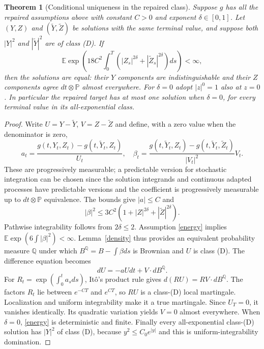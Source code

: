 \documentclass[11pt]{article}
\newtheorem{theorem}{Theorem}
\newcommand{\E}{\mathbb E}
\newcommand{\Prb}{\mathbb P}
\newcommand{\Q}{\mathbb Q}
\begin{document}
\begin{theorem}[Conditional uniqueness in the repaired class]\label{main}
Suppose $g$ has all the repaired assumptions above with constant $C>0$
and exponent $\delta\in[0,1]$. Let $(Y,Z)$ and $(\widetilde Y,\widetilde Z)$
be solutions with the same terminal value, and suppose both $|Y|^2$ and
$|\widetilde Y|^2$ are of class (D). If
\begin{equation}\label{energy}
 \E\exp\left(18C^2\int_0^T
                  (|Z_s|^{2\delta}+|\widetilde Z_s|^{2\delta})ds\right)
 <\infty,
\end{equation}
then the solutions are equal: their $Y$ components are indistinguishable
and their $Z$ components agree $dt\otimes\Prb$ almost everywhere.
For $\delta=0$ adopt $|z|^0=1$ also at $z=0$.
In particular the repaired target has at most one solution when
$\delta=0$, for every terminal value in its all-exponential class.
\end{theorem}
\begin{proof}
Write $U=Y-\widetilde Y$, $V=Z-\widetilde Z$ and define, with a zero
value when the denominator is zero,
\[
 a_t=\frac{g(t,Y_t,Z_t)-g(t,\widetilde Y_t,Z_t)}{U_t},\quad
 \beta_t=\frac{g(t,\widetilde Y_t,Z_t)-g(t,\widetilde Y_t,\widetilde Z_t)}
                    {|V_t|^2}V_t.
\]
These are progressively measurable; a predictable version for stochastic
integration can be chosen since the solution integrands and continuous
adapted processes have predictable versions and the coefficient is
progressively measurable up to $dt\otimes\Prb$ equivalence.
The bounds give $|a|\leq C$ and
\[
 |\beta|^2\leq3C^2(1+|Z|^{2\delta}+|\widetilde Z|^{2\delta}).
\]
Pathwise integrability follows from $2\delta\leq2$. Assumption
\eqref{energy} implies $\E\exp(6\int|\beta|^2)<\infty$.
Lemma~\ref{density} thus provides an equivalent probability measure
$\Q$ under which $B^\Q=B-\int\beta ds$ is Brownian and $U$ is
class (D). The difference equation becomes
\[
 dU=-aUdt+V\cdot dB^\Q.
\]
For $R_t=\exp(\int_0^t a_sds)$, It\^o's product rule gives
$d(RU)=RV\cdot dB^\Q$. The factors $R_t$ lie between $e^{-CT}$ and
$e^{CT}$, so $RU$ is a class-(D) local martingale. Localization and
uniform integrability make it a true martingale. Since $U_T=0$, it
vanishes identically. Its quadratic variation yields $V=0$ almost
everywhere. When $\delta=0$, \eqref{energy} is deterministic and finite.
Finally every all-exponential class-(D) solution has $|Y|^2$ of class (D),
because $y^2\leq C_0e^{|y|}$ and this is uniform-integrability domination.
\end{proof}
\end{document}
